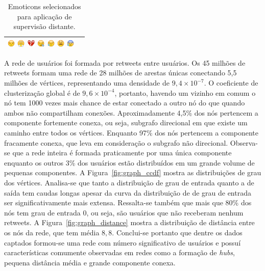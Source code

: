 \begin{table}[h]
\begin{center}
\begin{tabular}{| l | c |}
            \includegraphics[height=1em]{images/emojis/1F612}
            \includegraphics[height=1em]{images/emojis/1F624}
            \includegraphics[height=1em]{images/emojis/1F494}
            \includegraphics[height=1em]{images/emojis/1F62A}
            \includegraphics[height=1em]{images/emojis/1F625}
            \includegraphics[height=1em]{images/emojis/1F62B}
            \includegraphics[height=1em]{images/emojis/1F630}
        \\ \hline
        \end{tabular}
        \caption{Emoticons selecionados para aplicação de supervisão distante.}
        \label{tab:emoticons}
    \end{center}
\end{table}

A rede de usuários foi formada por retweets entre usuários.
Os 45 milhões de retweets formam uma rede de 28 milhões de arestas únicas
conectando 5,5 milhões de vértices, representando uma densidade de
$9,4\times10^{-7}$.
O coeficiente de clusterização global é de $9,6\times10^{-4}$, portanto,
havendo um vizinho em comum o nó tem 1000 vezes mais chance de estar conectado a
outro nó do que quando ambos não compartilham conexões.
Aproximadamente 4,5\% dos nós pertencem a componente fortemente conexa, ou seja,
subgrafo direcional em que existe um caminho entre todos os vértices.
Enquanto 97\% dos nós pertencem a componente fracamente conexa, que leva em
consideração o subgrafo não direcional.
Observa-se que a rede inteira é formada praticamente por uma única componente
enquanto os outros 3\% dos usuários estão distribuídos em um grande
volume de pequenas componentes.
A Figura~\ref{fig:graph_ccdf} mostra as distribuições de grau dos vértices.
Analisa-se que tanto a distribuição de grau de entrada quanto a de saída tem
caudas longas apesar da curva da distribuição de de grau de entrada ser
significativamente mais extensa.
Ressalta-se também que mais que 80\% dos nós tem grau de entrada 0, ou seja,
são usuários que não receberam nenhum retweets.
A Figura~\ref{fig:graph_distance} mostra a distribuição de distância entre os
nós da rede, que tem média $8,8$.
Conclui-se portanto que dentre os dados captados formou-se uma rede com número
significativo de usuários e possuí características comumente observadas em redes
como a formação de \textit{hubs}, pequena distância média e grande componente
conexa.

